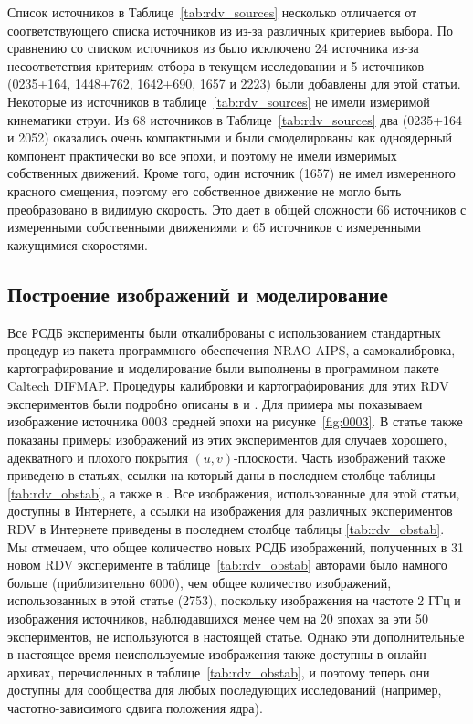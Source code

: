Список источников в Таблице~\ref{tab:rdv_sources} несколько отличается от соответствующего списка
источников из \cite{Piner_2007} из-за различных критериев выбора. По сравнению со списком источников
из \cite{Piner_2007} было исключено 24 источника из-за несоответствия критериям отбора в текущем
исследовании и 5 источников (0235+164, 1448+762, 1642+690, 1657 и 2223)
были добавлены для этой статьи. Некоторые из источников в таблице~\ref{tab:rdv_sources} не имели
измеримой кинематики струи. Из 68 источников в Таблице~\ref{tab:rdv_sources} два (0235+164 и
2052) оказались очень компактными и были смоделированы как одноядерный компонент
практически во все эпохи, и поэтому не имели измеримых собственных движений. Кроме того, один
источник (1657) не имел измеренного красного смещения, поэтому его собственное движение
не могло быть преобразовано в видимую скорость. Это дает в общей сложности 66 источников с
измеренными собственными движениями и 65 источников с измеренными кажущимися скоростями.

\subsection{Построение изображений и моделирование}

Все РСДБ эксперименты были откалиброваны с использованием стандартных процедур из пакета
программного обеспечения NRAO AIPS, а самокалибровка, картографирование и моделирование были
выполнены в программном пакете Caltech DIFMAP. Процедуры калибровки и картографирования для этих RDV
экспериментов были подробно описаны в \cite{Piner_2007} и \cite{Pushkarev_2012b}. Для примера мы
показываем изображение источника 0003 средней эпохи на рисунке~\ref{fig:0003}. В статье
\cite{Piner_2007} также показаны примеры изображений из этих экспериментов для случаев хорошего,
адекватного и плохого покрытия $(u, v)$-плоскости. Часть изображений также приведено в статьях,
ссылки на который даны в последнем столбце таблицы \ref{tab:rdv_obstab}, а также в
\cite{Pushkarev_2012b}. Все изображения, использованные для этой статьи, доступны в Интернете, а
ссылки на изображения для различных экспериментов RDV в Интернете приведены в последнем столбце
таблицы \ref{tab:rdv_obstab}. Мы отмечаем, что общее количество новых РСДБ изображений, полученных в
31 новом RDV эксперименте в таблице~\ref{tab:rdv_obstab} авторами было намного больше
(приблизительно 6000), чем общее количество изображений, использованных в этой статье (2753),
поскольку изображения на частоте 2 ГГц и изображения источников, наблюдавшихся менее чем на 20
эпохах за эти 50 экспериментов, не используются в настоящей статье. Однако эти дополнительные в
настоящее время неиспользуемые изображения также доступны в онлайн-архивах, перечисленных в
таблице~\ref{tab:rdv_obstab}, и поэтому теперь они доступны для сообщества для любых последующих
исследований (например, частотно-зависимого сдвига положения ядра).

